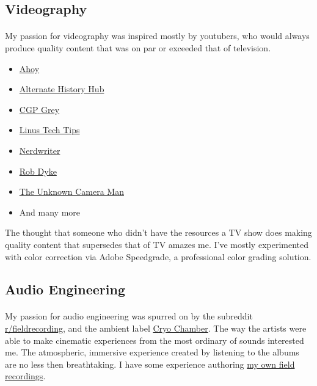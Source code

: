 \subsection{Videography}
\paragraph{}
My passion for videography was inspired mostly by youtubers, who would always
produce quality content that was on par or exceeded that of television.

\begin{itemize}
	\item \href{https://www.youtube.com/channel/UCE1jXbVAGJQEORz9nZqb5bQ}{Ahoy}
	\item \href{https://www.youtube.com/channel/UClfEht64_NrzHf8Y0slKEjw}{Alternate History Hub}
	\item \href{https://www.youtube.com/channel/UC2C_jShtL725hvbm1arSV9w}{CGP Grey}
	\item \href{https://www.youtube.com/user/LinusTechTips}{Linus Tech Tips}
	\item \href{https://www.youtube.com/channel/UCJkMlOu7faDgqh4PfzbpLdg}{Nerdwriter}
	\item \href{https://www.youtube.com/channel/UCYxrnDjNQZIs_aAcdhqSveg}{Rob Dyke}
	\item \href{https://www.youtube.com/user/TheUnknownCameraman}{The Unknown Camera Man}
	\item And many more
\end{itemize}

The thought that someone who didn't have the resources a TV show does making
quality content that supersedes that of TV amazes me. I've mostly experimented
with color correction via Adobe Speedgrade, a professional color grading
solution.
\par

\subsection{Audio Engineering}
\paragraph{}
My passion for audio engineering was spurred on by the subreddit \href{https://www.reddit.com/r/fieldrecording/}{r/fieldrecording},
and the ambient label \href{https://cryochamber.bandcamp.com/}{Cryo Chamber}.
The way the artists were able to make cinematic experiences from the most
ordinary of sounds interested me. The atmospheric, immersive experience created
by listening to the albums are no less then breathtaking. I have some experience
authoring \href{https://theodoretubbs.bandcamp.com/}{my own field recordings}.
\par

